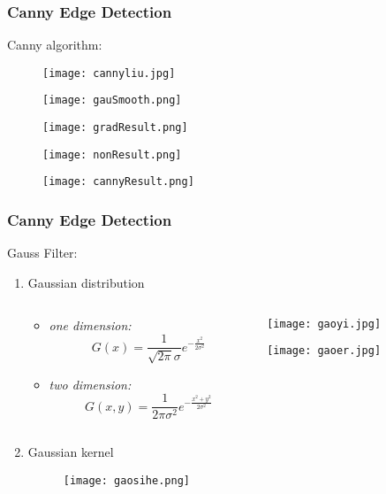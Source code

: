 \documentclass[notheorems,serif,table,compress]{beamer}  %
\begin{document}
\begin{frame}
\frametitle{Canny Edge Detection}
{\color{blue}Canny algorithm:}
    \begin{figure}
    \texttt{[image: cannyliu.jpg]} 
    \end{figure}
    \begin{figure}
    \begin{minipage}[t]{0.22\linewidth}
    \texttt{[image: gauSmooth.png]} 
    \end{minipage}
    \begin{minipage}[t]{0.22\linewidth}
    \texttt{[image: gradResult.png]} 
    \end{minipage}
    \begin{minipage}[t]{0.22\linewidth}
    \texttt{[image: nonResult.png]} 
    \end{minipage}
    \begin{minipage}[t]{0.22\linewidth}
    \texttt{[image: cannyResult.png]} 
    \end{minipage}
    \end{figure}
\end{frame}

\begin{frame}
\frametitle{Canny Edge Detection}
{\color{blue}Gauss Filter:}
\begin{enumerate}
\item Gaussian distribution
\begin{columns}
\begin{column}{0.55\linewidth}
  \begin{itemize}
    \item \emph{one dimension:}
        \begin{displaymath}
        G(x)=\frac {1}{\sqrt{2\pi}\sigma}e^{-\frac{x^{2}}{2\sigma^{2}}}
        \end{displaymath}
    \item \emph{two dimension:}
        \begin{displaymath}
        G(x,y)=\frac {1}{2\pi \sigma^{2}}e^{-\frac{x^{2}+y^{2}}{2\sigma^{2}}}
        \end{displaymath}
  \end{itemize}
\end{column}
\begin{column}{0.45\linewidth}
    \centering\texttt{[image: gaoyi.jpg]}
    
    \centering\texttt{[image: gaoer.jpg]} 
\end{column}
\end{columns}\vspace{1ex}
\item Gaussian kernel
    \begin{figure}
    \centering\texttt{[image: gaosihe.png]} 
    \end{figure}
\end{enumerate}
\end{frame}
\end{document}
